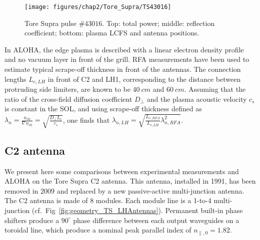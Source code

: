 \begin{figure}[h]
	\texttt{[image: figures/chap2/Tore\_Supra/TS43016]}
	\caption{Tore Supra pulse $\#43016$. Top: total power; middle: reflection coefficient; bottom: plasma LCFS and antenna positions.}
	\label{fig:TS43016}
\end{figure}


In ALOHA, the edge plasma is described with a linear electron density profile and no vacuum layer in front of the grill. RFA measurements have been used to estimate typical scrape-off thickness in front of the antennas\cite{kocan2008-1}. The connection lengths $L_{c,LH}$ in front of C2 and LH1, corresponding to the distance between protruding side limiters, are known to be $40~\si{cm}$ and $60~\si{cm}$. Assuming that the ratio of the cross-field diffusion coefficient $D_\perp$ and the plasma acoustic velocity $c_s$ is constant in the SOL, and using scrape-off thickness defined as $\lambda_n=\frac{n_{e0}}{\nabla n_{e0}}=\sqrt{\frac{D_\perp L_c}{c_s}}$, one finds that $\lambda_{n,LH}=\sqrt{\frac{L_{c,RFA}}{L_{c,LH}}\lambda_{n,RFA}^2}$. 



\subsection{C2 antenna}
We present here some comparisons between experimental measurements and ALOHA on the Tore Supra C2 antenna. This antenna, installed in 1991, has been removed in 2009 and replaced by a new passive-active multi-junction antenna\cite{guilhem2009,guilhem2011}. The C2 antenna is made of 8 modules. Each module line is a 1-to-4 multi-junction (cf.~Fig~\ref{fig:geometry_TS_LHAntennas}). Permanent built-in phase shifters produce a $90^\circ$ phase difference between each output waveguides on a toroidal line, which produce a nominal peak parallel index of $n_{\parallel,0}=1.82$.

